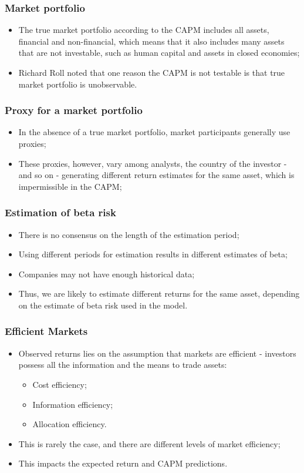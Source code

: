 \documentclass[11pt,a4paper]{report}
\begin{document}
\subsubsection{Market portfolio}
\begin{itemize}
    \item The true market portfolio according to the CAPM includes all assets, financial and non-financial, which means that it also includes many assets that are not investable, such as human capital and assets in closed economies;
    \item Richard Roll noted that one reason the CAPM is not testable is that true market portfolio is unobservable.
\end{itemize}
\subsubsection{Proxy for a market portfolio}
\begin{itemize}
    \item In the absence of a true market portfolio, market participants generally use proxies;
    \item These proxies, however, vary among analysts, the country of the investor - and so on - generating different return estimates for the same asset, which is impermissible in the CAPM;
\end{itemize}
\subsubsection{Estimation of beta risk}
\begin{itemize}
    \item There is no consensus on the length of the estimation period;
    \item Using different periods for estimation results in different estimates of beta;
    \item Companies may not have enough historical data;
    \item Thus, we are likely to estimate different returns for the same asset, depending on the estimate of beta risk used in the model.
\end{itemize}
\subsubsection{Efficient Markets}
\begin{itemize}
    \item Observed returns lies on the assumption that markets are efficient - investors possess all the information and the means to trade assets:
    \begin{itemize}
        \item Cost efficiency;
        \item Information efficiency;
        \item Allocation efficiency.
    \end{itemize}
    \item This is rarely the case, and there are different levels of market efficiency;
    \item This impacts the expected return and CAPM predictions.
\end{itemize}
\end{document}
